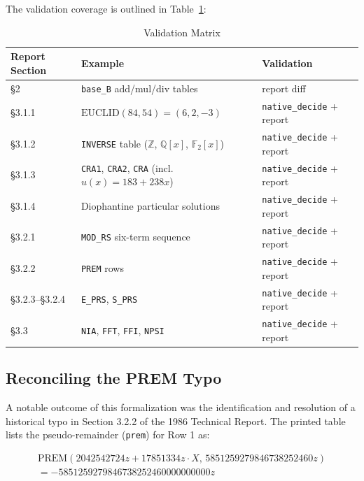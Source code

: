 \documentclass[11pt,a4paper]{article}
\begin{document}
The validation coverage is outlined in Table~\ref{tab:validation}:

\begin{table}[htbp]
\centering
\caption{Validation Matrix}
\label{tab:validation}
\small
\begin{tabularx}{\textwidth}{@{}l>{\raggedright\arraybackslash}X>{\raggedright\arraybackslash}p{3.2cm}@{}}
\toprule
\textbf{Report Section} & \textbf{Example} & \textbf{Validation} \\
\midrule
\S2 & \texttt{base\_B} add/mul/div tables & report diff \\
\S3.1.1 & $\mathrm{EUCLID}(84, 54) = (6, 2, -3)$ & \texttt{native\_decide} + report \\
\S3.1.2 & \texttt{INVERSE} table ($\mathbb{Z}$, $\mathbb{Q}[x]$, $\mathbb{F}_2[x]$) & \texttt{native\_decide} + report \\
\S3.1.3 & \texttt{CRA1}, \texttt{CRA2}, \texttt{CRA} (incl. $u(x) = 183 + 238x$) & \texttt{native\_decide} + report \\
\S3.1.4 & Diophantine particular solutions & \texttt{native\_decide} + report \\
\S3.2.1 & \texttt{MOD\_RS} six-term sequence & \texttt{native\_decide} + report \\
\S3.2.2 & \texttt{PREM} rows & \texttt{native\_decide} + report \\
\S3.2.3--\S3.2.4 & \texttt{E\_PRS}, \texttt{S\_PRS} & \texttt{native\_decide} + report \\
\S3.3 & \texttt{NIA}, \texttt{FFT}, \texttt{FFI}, \texttt{NPSI} & \texttt{native\_decide} + report \\
\bottomrule
\end{tabularx}
\end{table}

\subsection{Reconciling the PREM Typo}
A notable outcome of this formalization was the identification and resolution of a historical typo in Section 3.2.2 of the 1986 Technical Report. The printed table lists the pseudo-remainder (\texttt{prem}) for Row 1 as:

\begin{multline*}
\mathrm{PREM}(2042542724z + 17851334z \cdot X,\, 5851259279846738252460z) \\
= -5851259279846738252460000000000z
\end{multline*}
\end{document}
